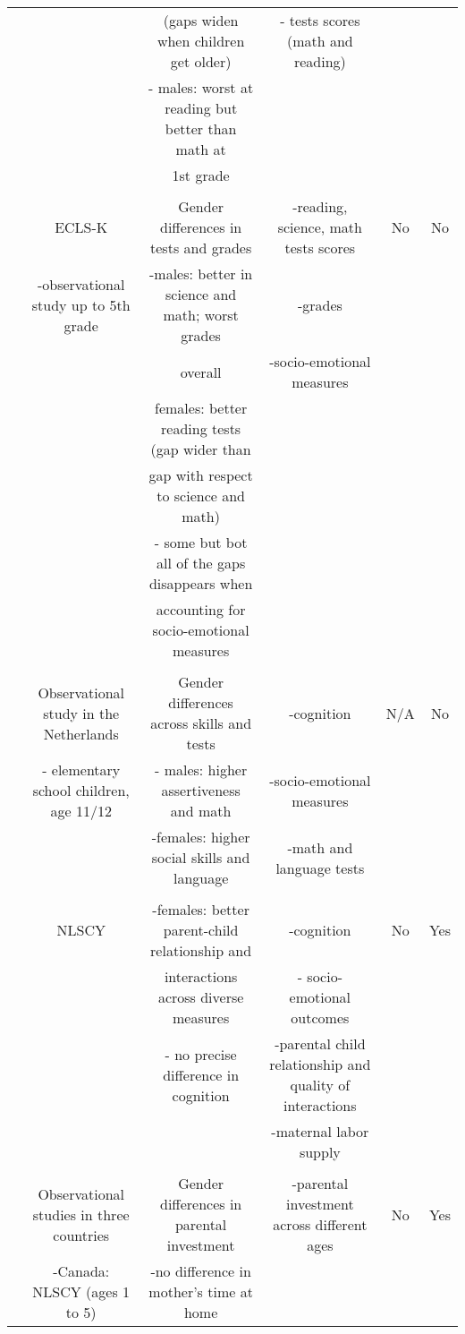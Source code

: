 \begin{tabular}{cccccc}
	&		&	(gaps widen when children get older)	&	- tests scores (math and reading)	&		&		\\ 
	&		&	- males: worst at reading but better than math at 	&		&		&		\\ 
	&		&	1st grade	&		&		&		\\ \\ \midrule
\citet{cornwell2013noncognitive}	&	ECLS-K 	&	Gender differences in tests and grades	&	-reading, science, math tests scores 	&	No	&	No	\\ 
	&	-observational study up to 5th grade	&	-males: better in science and math; worst grades	&	-grades	&		&		\\ 
	&		&	overall 	&	-socio-emotional measures	&		&		\\ 
	&		&	females: better reading tests (gap wider than 	&		&		&		\\ 
	&		&	gap with respect to science and math)	&		&		&		\\ 
	&		&	- some but bot all of the gaps disappears when	&		&		&		\\ 
	&		&	accounting for socio-emotional measures 	&		&		&		\\ \\ \midrule
\citet{golsteyn2014gender}	&	Observational study in the Netherlands	&	Gender differences across skills and tests	&	-cognition	&	N/A 	&	No	\\ 
	&	- elementary school children, age 11/12 	&	- males: higher assertiveness and math	&	-socio-emotional measures	&		&		\\ 
	&		&	-females: higher social skills and language	&	-math and language tests	&		&		\\ \\ \midrule
\citet{kottelenberg_Gender}	&	NLSCY	&	-females: better parent-child relationship and 	&	-cognition	&	No	&	Yes	\\ 
	&		&	interactions across diverse measures	&	- socio-emotional outcomes	&		&		\\ 
	&		&	- no precise difference in cognition	&	-parental child relationship and quality of interactions	&		&		\\ 
	&		&		&	-maternal labor supply	&		&		\\ \\ \midrule
\citet{Baker-Milligan_2013_Boy-Girl-Differences}	&	Observational studies in three countries	&	Gender differences in parental investment 	&	-parental investment across different ages	&	No	&	Yes	\\ 
	&	-Canada: NLSCY (ages 1 to 5)	&	-no difference in mother's time at home 	&		&		&		\\ 

\end{tabular}
